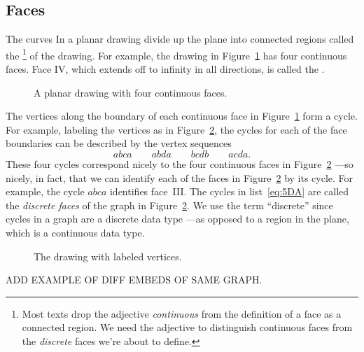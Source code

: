 \subsection{Faces}

The curves In a planar drawing divide up the plane into connected
regions called the \footnote{Most texts drop
  the adjective \emph{continuous} from the definition of a face as a
  connected region.  We need the adjective to distinguish continuous
  faces from the \emph{discrete} faces we're about to define.} of the
drawing.  For example, the drawing in
Figure~\ref{fig:continuous-faces} has four continuous faces.  Face IV,
which extends off to infinity in all directions, is called the
.

\begin{figure}


\caption{A planar drawing with four continuous faces.}
\label{fig:continuous-faces}
\end{figure}

The vertices along the boundary of each continuous face in
Figure~\ref{fig:continuous-faces} form a cycle.  For example, labeling the
vertices as in Figure~\ref{fig:continuous-cycles}, the cycles for each of the face
boundaries can be described by the vertex sequences
\begin{equation}\label{eq:5DA}
abca \qquad abda \qquad bcdb \qquad acda.
\end{equation}
These four cycles correspond nicely to the four continuous faces in
Figure~\ref{fig:continuous-cycles} ---so nicely, in fact, that we can
identify each of the faces in Figure~\ref{fig:continuous-cycles} by
its cycle.  For example, the cycle $abca$ identifies
face~III\@.  The cycles in list~\ref{eq:5DA} are called the
\emph{discrete faces} of the graph in
Figure~\ref{fig:continuous-cycles}.  We use the term ``discrete''
since cycles in a graph are a discrete data type ---as opposed to a
region in the plane, which is a continuous data type.

\begin{figure}


\caption{The drawing with labeled vertices.}
\label{fig:continuous-cycles}
\end{figure}


\begin{editingnotes}
ADD EXAMPLE OF DIFF EMBEDS OF SAME GRAPH.
\end{editingnotes}

